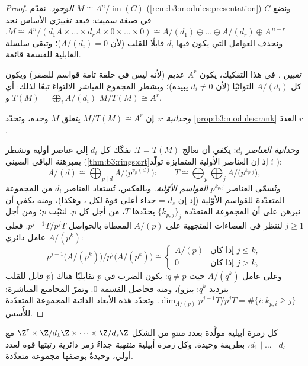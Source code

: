 \begin{proof}
\emph{الوجود.} نقدّم $M \cong A^n/\operatorname{im}(C)$ (\cref{rem:b3:modules:presentation}) ونضع $C$ في صيغة سميث:
فبعد تغييرَي الأساس نجد $M \cong A^n / (d_1A \times \dots
\times d_rA \times 0 \times \dots \times 0) \cong A/(d_1) \oplus
\dots \oplus A/(d_r) \oplus A^{\,n - r}$. ونحذف العوامل التي يكون فيها
$d_i$ قابلًا للقلب (لأن $A/(d_i) = 0$)؛ وتبقى سلسلة القابلية
للقسمة قائمة.

\emph{تعيين .} في هذا التفكيك، يكون $A^r$ عديم 
(لأنه ليس في حلقة تامة قواسم للصفر) ويكون كل $A/(d_i)$ التوائيًا
(لأن $d_i \ne 0$ يبيده)؛ ويشطر المجموع المباشر الالتواءَ تبعًا
لذلك: أي $T(M) = \bigoplus_i A/(d_i)$ و $M/T(M) \cong A^r$.

\emph{وحدانية $r$}: إن $M/T(M) \cong A^r$ يتعلق  $M$ وحده، وتحدّد
\cref{prop:b3:modules:rank} العددَ $r$.

\emph{وحدانية العناصر $d_i$}: يكفي أن نعالج  
$T = T(M)$. نفكّك كل $d_i$ إلى عناصر أولية ونشطر بمبرهنة الباقي
الصيني (\cref{thm:b3:rings:crt}؛ إذ إن العناصر الأولية المتمايزة تولّد ):
\[
A/(d) \cong \bigoplus_{p \mid d} A/\bigl(p^{v_p(d)}\bigr):
\qquad
T \cong \bigoplus_{p} \bigoplus_{j} A/\bigl(p^{k_{p,j}}\bigr),
\]
وتُسمّى العناصر $p^{k_{p,j}}$ \emph{القواسم
الأوّلية}. وبالعكس، تُستعاد العناصر $d_i$ من
المجموعة المتعدّدة للقواسم الأوّلية (إذ إن $d_s$ = جداء أعلى قوة
لكل ، وهكذا)، ومنه يكفي أن نبرهن على أن المجموعة
المتعدّدة $\{k_{p,j}\}_j$ يحدّدها $T$، من أجل كل  $p$.
لنثبّت $p$؛ ومن أجل $j \geq 1$ لننظر في الفضاءات المتجهية على
$A/(p)$ المعطاة بالحواصل $p^{j-1}T/p^jT$. فعلى عامل دائري $A/(p^k)$:
\[
p^{j-1}\bigl(A/(p^k)\bigr)\big/p^{j}\bigl(A/(p^k)\bigr)
\cong
\begin{cases}
A/(p) & \text{إذا كان } j \leq k,\\
0 & \text{إذا كان } j > k,
\end{cases}
\]
وعلى عامل $A/(q^k)$ حيث $q \neq p$: يكون الضرب في $p$ تقابليًا
هناك ($p$ قابل للقلب بترديد $q^k$: بيزو)، ومنه فحاصل القسمة $0$.
وتمرّ المجاميع المباشرة: $\dim_{A/(p)}
p^{j-1}T/p^jT = \#\{i : k_{p,i} \geq j\}$. وتحدّد هذه الأبعاد الذاتية
المجموعةَ المتعدّدة للأُسس.
\end{proof}

\begin{corollary}
\label{cor:b3:modules:abelian}
كل زمرة أبيلية مولَّدة بعدد منتهٍ من الشكل $\Z^r \times
\Z/d_1\Z\times\dots\times\Z/d_s\Z$ مع $d_1 \mid \dots \mid
d_s$،
بطريقة وحيدة. وكل زمرة أبيلية \emph{منتهية} جداءُ زمر دائرية
رتبتها قوة لعدد أولي، وحيدةٌ بوصفها مجموعة متعدّدة.
\end{corollary}

